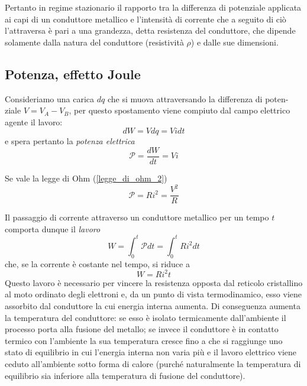 \documentclass[class=book, crop=false, oneside, 12pt]{standalone}
\begin{document}
Pertanto in regime stazionario il rapporto tra la differenza di potenziale applicata ai capi di un conduttore metallico e l'intensità di corrente che a seguito di ciò l'attraversa è pari a una grandezza, detta resistenza del conduttore, che dipende solamente dalla natura del conduttore (resistività \(\rho\)) e dalle sue dimensioni.

\subsection{Potenza, effetto Joule}

Consideriamo una carica \(dq\) che si muova attraversando la differenza di poten-ziale \(V= V_A -V_B\), per questo spostamento viene compiuto dal campo elettrico agente il lavoro:
\begin{equation*}
    d W = V dq = V i dt
\end{equation*}
e spera pertanto la \emph{potenza elettrica}
\begin{equation}
    \mathcal{P} = \frac{dW}{dt} = V i
\end{equation}

Se vale la legge di Ohm (\ref{legge_di_ohm_2})
\begin{equation}
    \mathcal{P} = R i^2 = \frac{V^2}{R}
\end{equation}

Il passaggio di corrente attraverso un conduttore metallico per un tempo \(t\) comporta dunque il \emph{lavoro} 
\begin{equation}
    W = \int_0^t \mathcal{P} dt = \int_0^t R i^2 dt
\end{equation}
che, se la corrente è costante nel tempo, si riduce a
\begin{equation}
    W = R i^2 t
\end{equation}
Questo lavoro è necessario per vincere la resistenza opposta dal reticolo cristallino al moto ordinato degli elettroni e, da un punto di vista termodinamico, esso viene assorbito dal conduttore la cui energia interna aumenta. 
Di conseguenza aumenta la temperatura del conduttore: se esso è isolato termicamente dall'ambiente il processo porta alla fusione del metallo; se invece il conduttore è in contatto termico con l'ambiente la sua temperatura cresce fino a che si raggiunge uno stato di equilibrio in cui l'energia interna non varia più e il lavoro elettrico viene ceduto all'ambiente sotto forma di calore (purché naturalmente la temperatura di equilibrio sia inferiore alla temperatura di fusione del conduttore). 
\end{document}
